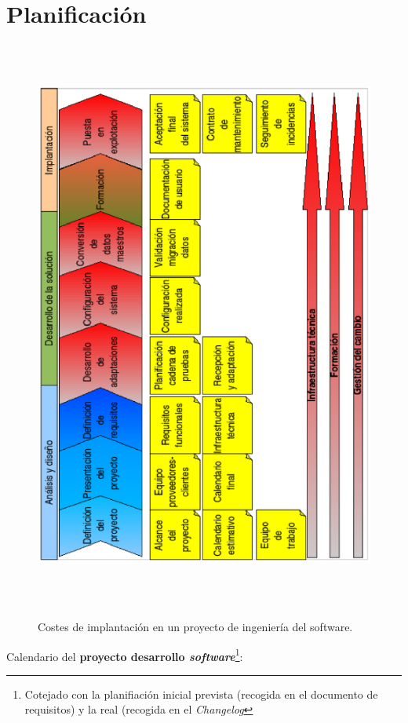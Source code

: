 \documentclass[a4paper]{article}
\begin{document}
    \section{Planificación}
    \begin{figure}[!ht]
        \centering
                \includegraphics[width=12.5cm,height=18.9cm]{implantacion.eps}\\
            \caption{Costes de implantación en un proyecto de ingeniería del software.}
            \label{implantacion}
    \end{figure}\par
    Calendario del \textbf{proyecto desarrollo \emph{software}}\footnote{Cotejado con la planifiación inicial prevista (recogida en el documento de requisitos) y la real (recogida en el \emph{Changelog}}:
\end{document}
